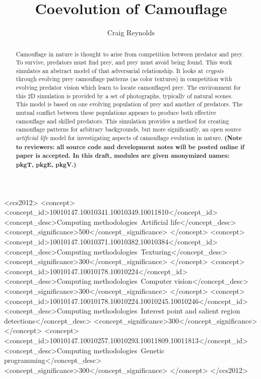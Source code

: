 \documentclass[acmtog]{acmart}
\newcommand{\texsyn}[0]{pkgT}
\newcommand{\lazypredator}[0]{pkgE}
\newcommand{\predatoreye}[0]{pkgV}
\begin{document}
\title{Coevolution of Camouflage}

\author{Craig Reynolds}

\renewcommand{\shortauthors}{Craig Reynolds}


\begin{abstract}
    Camouflage in nature is thought to arise from competition between predator and prey. To survive, predators must find prey, and prey must avoid being found. This work simulates an abstract model of that adversarial relationship. It looks at \textit{crypsis} through evolving prey camouflage patterns (as color textures) in competition with evolving predator vision which learn to locate camouflaged prey. The environment for this 2D simulation is provided by a set of photographs, typically of natural scenes. This model is based on one evolving population of prey and another of predators. The mutual conflict between these populations appears to produce both effective camouflage and skilled predators. This simulation provides a method for creating camouflage patterns for arbitrary backgrounds, but more significantly, an open source \textit{artificial life} model for investigating aspects of camouflage evolution in nature. \textbf{(Note to reviewers: all source code and development notes will be posted online if paper is accepted. In this draft, modules are given anonymized names: \texsyn{}, \lazypredator{}, \predatoreye{}.)}
\end{abstract}


\begin{CCSXML}
<ccs2012>
   <concept>
       <concept_id>10010147.10010341.10010349.10011810</concept_id>
       <concept_desc>Computing methodologies~Artificial life</concept_desc>
       <concept_significance>500</concept_significance>
       </concept>
   <concept>
       <concept_id>10010147.10010371.10010382.10010384</concept_id>
       <concept_desc>Computing methodologies~Texturing</concept_desc>
       <concept_significance>300</concept_significance>
       </concept>
   <concept>
       <concept_id>10010147.10010178.10010224</concept_id>
       <concept_desc>Computing methodologies~Computer vision</concept_desc>
       <concept_significance>300</concept_significance>
       </concept>
    <concept>
       <concept_id>10010147.10010178.10010224.10010245.10010246</concept_id>
       <concept_desc>Computing methodologies~Interest point and salient region detections</concept_desc>
       <concept_significance>300</concept_significance>
       </concept>
    <concept>
        <concept_id>10010147.10010257.10010293.10011809.10011813</concept_id>
        <concept_desc>Computing methodologies~Genetic programming</concept_desc>
        <concept_significance>300</concept_significance>
        </concept>
 </ccs2012>
\end{CCSXML}
\end{document}
